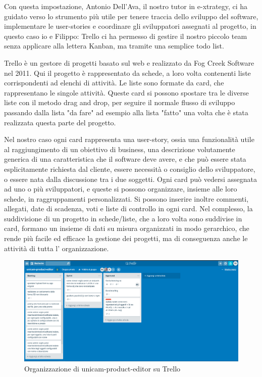 Con questa impostazione, Antonio Dell'Ava, il nostro tutor in e-xtrategy, ci ha guidato verso lo strumento più utile per tenere traccia dello sviluppo del software, implementare le user-stories e coordinare gli sviluppatori assegnati al progetto, in questo caso io e Filippo: Trello ci ha permesso di gestire il nostro piccolo team senza applicare alla lettera Kanban, ma tramite una semplice todo list.

Trello\cite{trello} è un gestore di progetti basato sul web e realizzato da Fog Creek Software nel 2011.
Qui il progetto è rappresentato da schede, a loro volta contenenti liste corrispondenti ad elenchi di attività. Le liste sono formate da card, che rappresentano le singole attività.
Queste card si possono spostare tra le diverse liste con il metodo drag and drop, per seguire il normale flusso di sviluppo passando dalla lista "da fare" ad esempio alla lista "fatto" una volta che è stata realizzata questa parte del progetto.

Nel nostro caso ogni card rappresenta una user-story, ossia una funzionalità utile al raggiungimento di un obiettivo di business, una descrizione volutamente generica di una caratteristica che il software deve avere, e che può essere stata esplicitamente richiesta dal cliente, essere necessità o consiglio dello sviluppatore, o essere nata dalla discussione tra i due soggetti.
Ogni card può vedersi assegnata ad uno o più sviluppatori, e queste si possono organizzare, insieme alle loro schede, in raggruppamenti personalizzati.
Si possono inserire inoltre commenti, allegati, date di scadenza, voti e liste di controllo in ogni card.
Nel complesso, la suddivisione di un progetto in schede/liste, che a loro volta sono suddivise in card, formano un insieme di dati su misura organizzati in modo gerarchico, che rende più facile ed efficace la gestione dei progetti, ma di conseguenza anche le attività di tutta l' organizzazione.

\begin{figure}[h]
	\centering
	\includegraphics[scale=0.35]{Immagini/trello_start.png} 
	\caption{Organizzazione di unicam-product-editor su Trello}
\end{figure}

